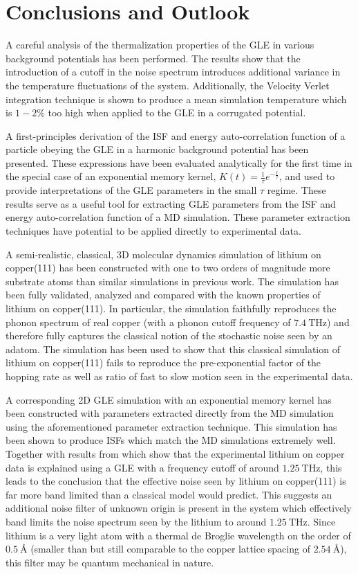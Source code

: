 
\chapter{Conclusions and Outlook}

A careful analysis of the thermalization properties of the GLE in various background potentials has been performed. The results show that the introduction of a cutoff in the noise spectrum introduces additional variance in the temperature fluctuations of the system. Additionally, the Velocity Verlet integration technique is shown to produce a mean simulation temperature which is $1-2\%$ too high when applied to the GLE in a corrugated potential.

A first-principles derivation of the ISF and energy auto-correlation function of a particle obeying the GLE in a harmonic background potential has been presented. These expressions have been evaluated analytically for the first time in the special case of an exponential memory kernel, $K(t)=\frac{1}{\tau}e^{-\frac{t}{\tau}}$, and used to provide interpretations of the GLE parameters in the small $\tau$ regime. These results serve as a useful tool for extracting GLE parameters from the ISF and energy auto-correlation function of a MD simulation. These parameter extraction techniques have potential to be applied directly to experimental data.

A semi-realistic, classical, 3D molecular dynamics simulation of lithium on copper(111) has been constructed with one to two orders of magnitude more substrate atoms than similar simulations in previous work. The simulation has been fully validated, analyzed and compared with the known properties of lithium on copper(111). In particular, the simulation faithfully reproduces the phonon spectrum of real copper (with a phonon cutoff frequency of $\SI{7.4}{\tera\hertz}$) and therefore fully captures the classical notion of the stochastic noise seen by an adatom. The simulation has been used to show that this classical simulation of lithium on copper(111) fails to reproduce the pre-exponential factor of the hopping rate as well as ratio of fast to slow motion seen in the experimental data.

A corresponding 2D GLE simulation with an exponential memory kernel has been constructed with parameters extracted directly from the MD simulation using the aforementioned parameter extraction technique. This simulation has been shown to produce ISFs which match the MD simulations extremely well. Together with results from \cite{Ward} which show that the experimental lithium on copper data is explained using a GLE with a frequency cutoff of around $\SI{1.25}{\tera\hertz}$, this leads to the conclusion that the effective noise seen by lithium on copper(111) is far more band limited than a classical model would predict. This suggests an additional noise filter of unknown origin is present in the system which effectively band limits the noise spectrum seen by the lithium to around $\SI{1.25}{\tera\hertz}$. Since lithium is a very light atom with a thermal de Broglie wavelength on the order of $\SI{0.5}{\angstrom}$ (smaller than but still comparable to the copper lattice spacing of $\SI{2.54}{\angstrom}$), this filter may be quantum mechanical in nature.

